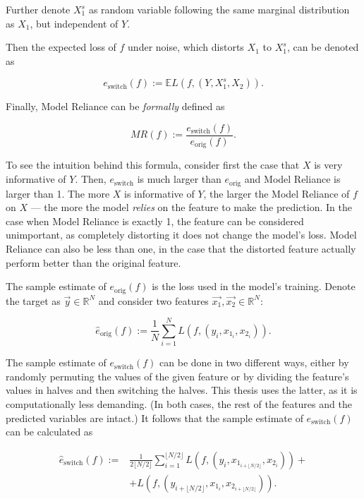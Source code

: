 			Further denote $X_1^s$ as random variable following the same marginal distribution as $X_1$, but independent of $Y$. 
			
			Then the expected loss of $f$ under noise, which distorts $X_1$ to $X_1^s$, can be denoted as 
			
			\begin{equation*}
				e_{\text{switch}}(f):= \mathbb{E} L(f,(Y,X_1^s, X_2)).
			\end{equation*} 
			
			Finally, Model Reliance can be \textit{formally} defined as 
			
			\begin{equation*}
				MR(f):=\frac{e_{\text{switch}}(f)}{e_{\text{orig}}(f)}.
			\end{equation*}
			
			To see the intuition behind this formula, consider first the case that $X$ is very informative of $Y$. Then, 	$e_{\text{switch}}$ is much larger than $e_{\text{orig}}$ and Model Reliance is larger than 1. The more $X$ is informative of $Y$, the larger the  Model Reliance of $f$ on $X$ --- the more the model \textit{relies} on the feature to make the prediction. In the case when Model Reliance is exactly 1, the feature can be considered unimportant, as completely distorting it does not change the model's loss. Model Reliance can also be less than one, in the case that the distorted feature actually perform better than the original feature.
					
			The sample estimate of $e_{\text{orig}}(f)$ is the loss used in the model's training. Denote the target as $\vec{y} \in \mathbb{R}^N$ and consider two features $\vec{x_1}, \vec{x_2} \in \mathbb{R}^{N}$:
			
			\begin{equation*}
				\hat{e}_{\text{orig}}(f):= \frac{1}{N} \sum_{i=1}^{N} L\left(f, (y_i, x_{1_i}, x_{2_i}) \right).
			\end{equation*} 
			
			The sample estimate of $e_{\text{switch}}(f)$ can be done in two different ways, either by randomly permuting the values of the given feature or by dividing the feature's values in halves and then switching the halves. This thesis uses the latter, as it is computationally less demanding. (In both cases, the rest of the features and the predicted variables are intact.) It follows that the sample estimate of $e_{\text{switch}}(f)$ can be calculated as
			
			
			\begin{equation*}
				\begin{split}
					\hat{e}_{\text{switch}}(f):= & \frac{1}{2 \lfloor N/2 \rfloor} \sum_{i=1}^{\lfloor N/2 \rfloor} L \left(f, \left( y_i, x_{1_{i+\lfloor N/2 \rfloor}}, x_{2_{i}} \right) \right) + \\ 
					& + L \left( f, \left(y_{i+\lfloor N/2 \rfloor}, x_{1_{i}}, x_{2_{i+\lfloor N/2 \rfloor}} \right) \right). 
				\end{split}
			\end{equation*}
			
